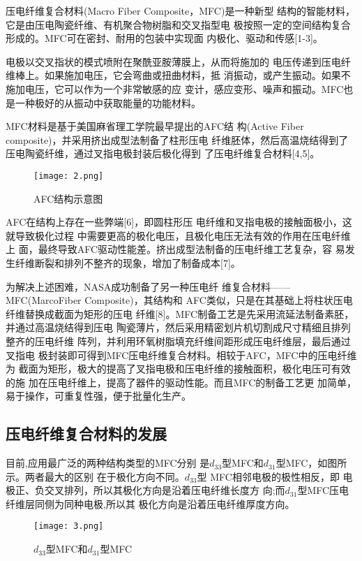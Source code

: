 \documentclass[lang=cn,11pt,a4paper,cite=authoryear]{elegantpaper}
\begin{document}
压电纤维复合材料(Macro Fiber Composite，MFC)是一种新型
结构的智能材料，它是由压电陶瓷纤维、有机聚合物树脂和交叉指型电
极按照一定的空间结构复合形成的。MFC可在密封、耐用的包装中实现面
内极化、驱动和传感[1-3]。

电极以交叉指状的模式喷附在聚酰亚胺薄膜上，从而将施加的
电压传递到压电纤维棒上。如果施加电压，它会弯曲或扭曲材料，抵
消振动，或产生振动。如果不施加电压，它可以作为一个非常敏感的应
变计，感应变形、噪声和振动。MFC也是一种极好的从振动中获取能量的功能材料。

MFC材料是基于美国麻省理工学院最早提出的AFC结
构(Active Fiber composite)，并采用挤出成型法制备了柱形压电
纤维胚体，然后高温烧结得到了压电陶瓷纤维，通过叉指电极封装后极化得到
了压电纤维复合材料[4,5]。

\begin{figure}[htbp]
  \centering
  \texttt{[image: 2.png]}
  \caption{AFC结构示意图}
\end{figure}

AFC在结构上存在一些弊端[6]，即圆柱形压
电纤维和叉指电极的接触面极小，这就导致极化过程
中需要更高的极化电压，且极化电压无法有效的作用在压电纤维上
面，最终导致AFC驱动性能差。挤出成型法制备的压电纤维工艺复杂，容
易发生纤维断裂和排列不整齐的现象，增加了制备成本[7]。
  
为解决上述困难，NASA成功制备了另一种压电纤
维复合材料——MFC(MarcoFiber Composite)，其结构和
AFC类似，只是在其基础上将柱状压电纤维替换成截面为矩形的压电
纤维[8]。MFC制备工艺是先采用流延法制备素胚，并通过高温烧结得到压电
陶瓷薄片，然后采用精密划片机切割成尺寸精细且排列整齐的压电纤维
阵列，并利用环氧树脂填充纤维间距形成压电纤维层，最后通过叉指电
极封装即可得到MFC压电纤维复合材料。相较于AFC，MFC中的压电纤维为
截面为矩形，极大的提高了叉指电极和压电纤维的接触面积，极化电压可有效的施
加在压电纤维上，提高了器件的驱动性能。而且MFC的制备工艺更
加简单，易于操作，可重复性强，便于批量化生产。

\subsection{压电纤维复合材料的发展}
目前,应用最广泛的两种结构类型的MFC分别
是$d_{33}$型MFC和$d_{31}$型MFC，如图所示。两者最大的区别
在于极化方向不同。$d_{33}$型 MFC相邻电极的极性相反，即
电极正、负交叉排列，所以其极化方向是沿着压电纤维长度方
向;而$d_{31}$型MFC压电纤维层同侧为同种电极,所以其
极化方向是沿着压电纤维厚度方向。

\begin{figure}[htbp]
  \centering
  \texttt{[image: 3.png]}
  \caption{$d_{33}$型MFC和$d_{31}$型MFC}
\end{figure}
\end{document}
